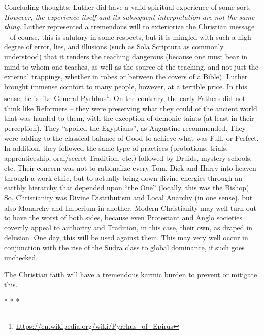 Concluding thoughts: Luther did have a valid spiritual experience of some sort. \emph{However, the experience itself and its subsequent interpretation are not the same thing}. Luther represented a tremendous will to exteriorize the Christian message -- of course, this is salutary in some respects, but it is mingled with such a high degree of error, lies, and illusions (such as Sola Scriptura as commonly understood) that it renders the teaching dangerous (because one must bear in mind to whom one teaches, as well as the source of the teaching, and not just the external trappings, whether in robes or between the covers of a Bible). Luther brought immense comfort to many people, however, at a terrible price. In this sense, he is like General Pyrhhus\footnote{\url{https://en.wikipedia.org/wiki/Pyrrhus\_of\_Epirus}}. On the contrary, the early Fathers did not think like Reformers -- they were preserving what they could of the ancient world that was handed to them, with the exception of demonic taints (at least in their perception). They ``spoiled the Egyptians'', as Augustine recommended. They were adding to the classical balance of Good to achieve what was Full, or Perfect. In addition, they followed the same type of practices (probations, trials, apprenticeship, oral/secret Tradition, etc.) followed by Druids, mystery schools, etc. Their concern was not to rationalize every Tom, Dick and Harry into heaven through a work ethic, but to actually bring down divine energies through an earthly hierarchy that depended upon ``the One'' (locally, this was the Bishop). So, Christianity was Divine Distributism and Local Anarchy (in one sense), but also Monarchy and Imperium in another. Modern Christianity may well turn out to have the worst of both sides, because even Protestant and Anglo societies covertly appeal to authority and Tradition, in this case, their own, as draped in delusion. One day, this will be used against them. This may very well occur in conjunction with the rise of the Sudra class to global dominance, if such goes unchecked.

The Christian faith will have a tremendous karmic burden to prevent or mitigate this.



\begin{center}* * *\end{center}

